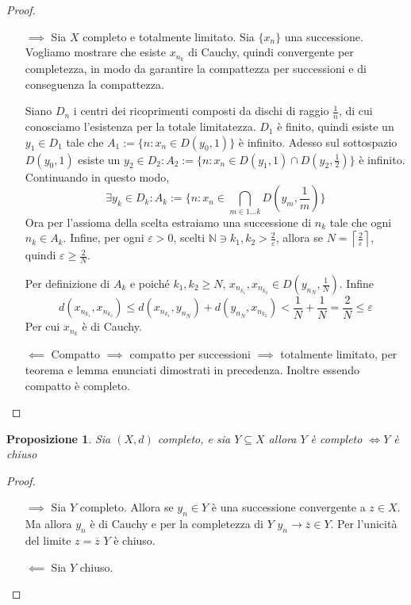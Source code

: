 \documentclass{article}
\newcounter{theo}[section]\setcounter{theo}{0}
\theoremstyle{plain}
\newtheorem{proposition}[theo]{Proposizione}
\theoremstyle{definition}
\theoremstyle{remark}
\begin{document}
\begin{proof}\( \)
\begin{itemize}
    \item[\(\implies \)] Sia \(X\) completo e totalmente limitato. Sia
        \(\{x_{n}\}\) una successione. Vogliamo mostrare che esiste \(x_{n_k}\)
        di Cauchy, quindi convergente per completezza, in modo da garantire la
        compattezza per successioni e di conseguenza la compattezza.

        Siano \(D_n\) i centri dei ricoprimenti composti da dischi di raggio
        \(\frac{1}{n}\), di cui conosciamo l'esistenza per la totale
        limitatezza. \(D_{1}\) è finito, quindi esiste un \(y_{1} \in D_{1}\)
        tale che \(A_{1} := \{n: x_{n} \in D(y_{0}, 1)\} \) è infinito. Adesso sul
        sottospazio \(D(y_{0}, 1)\) esiste un \(y_{2} \in D_{2} : A_{2} := \{n:
        x_{n} \in D(y_{1}, 1) \cap D(y_{2}, \frac{1}{2})\} \) è infinito.
        Continuando in questo modo, \[\exists y_k \in D_k : A_k := \{n : x_{n} \in
        \bigcap_{m \in 1\dots k} D\left( y_m, \frac{1}{m} \right)  \} \] 
        Ora per l'assioma della scelta estraiamo una successione di \(n_k\) tale
        che ogni \(n_k \in A_k\). Infine, per ogni \(\varepsilon > 0\), scelti
        \(\mathbb{N} \ni k_{1}, k_{2} > \frac{2}{\varepsilon}\), allora se \(N =
        \left\lceil \frac{2}{\varepsilon} \right\rceil \), quindi \(\varepsilon
        \ge \frac{2}{N}\).

        Per definizione di \(A_k\) e poiché \(k_{1}, k_{2} \ge N\), 
        \(x_{n_{k_{1}}}, x_{n_{k_{2}}} \in D\left( y_{n_N}, \frac{1}{N} \right) \).
        Infine
        \[d(x_{n_{k_{1}}}, x_{n_{k_{2}}}) \le d(x_{n_{k_{1}}}, y_{n_N}) +
            d(y_{n_N},
        x_{n_{k_{2}}}) < \frac{1}{N} + \frac{1}{N} = \frac{2}{N} \le \varepsilon\] 
        Per cui \(x_{n_k}\) è di Cauchy.
        
    \item[\(\impliedby \)] Compatto \(\implies \) compatto per successioni
        \(\implies \) totalmente limitato, per teorema e lemma enunciati
        dimostrati in precedenza. Inoltre essendo compatto è completo.
\end{itemize}
\end{proof}
\begin{proposition}
    Sia \((X, d)\) completo, e sia \(Y \subseteq X \) allora \(Y\) è completo
    \(\iff Y\) è chiuso
\end{proposition}
\begin{proof}\( \)
\begin{itemize}
    \item[\(\implies \)] Sia \(Y\) completo. Allora se \(y_{n} \in Y\) è una
        successione convergente a \(z \in X\). Ma allora \(y_{n}\) è di Cauchy e
        per la completezza di \(Y\) \(y_{n} \to \overline{z} \in Y\). Per
        l'unicità del limite \(z = \overline{z}\) \(Y\) è chiuso.
    \item[\(\impliedby \)] Sia \(Y\) chiuso. 
\end{itemize}
\end{proof}
\end{document}
